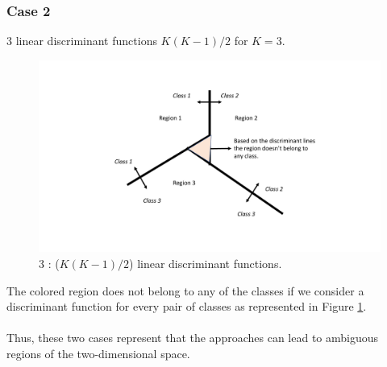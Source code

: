 \documentclass{article}
\begin{document}
\subsubsection{Case 2}
3 linear discriminant functions $K(K-1)/2$ for $K=3$.
\begin{figure}[H]
    \centering
    \includegraphics[trim = 0cm 0cm 0cm 0cm,scale = 0.5]{second_condition.pdf}
    \caption{3 : ($K(K-1)/2$) linear discriminant functions.}
 \label{fig:case2}
 \end{figure}
The colored region does not belong to any of the classes if we consider a discriminant function for every pair of classes as represented in Figure \ref{fig:case2}.\\
\\
Thus, these two cases represent that the approaches can lead to ambiguous regions of the two-dimensional space.

\end{document}
